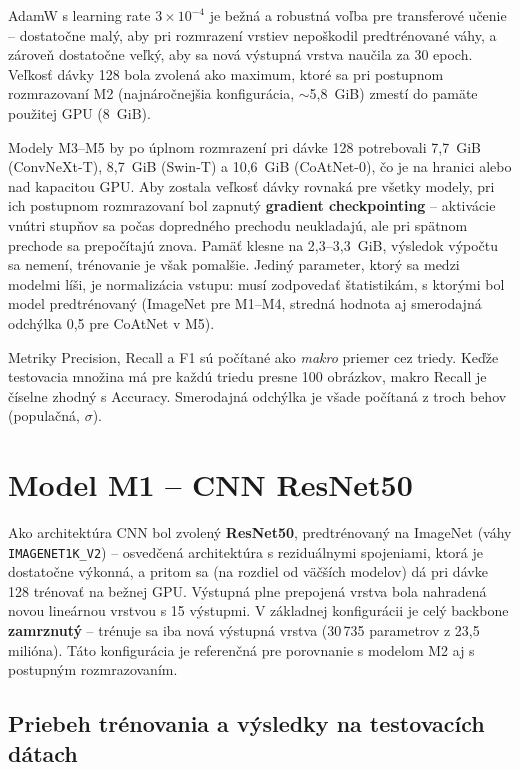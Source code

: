 AdamW s learning rate $3 \times 10^{-4}$ je bežná a robustná voľba pre
transferové učenie -- dostatočne malý, aby pri rozmrazení vrstiev
nepoškodil predtrénované váhy, a zároveň dostatočne veľký, aby sa nová
výstupná vrstva naučila za 30 epoch. Veľkosť dávky 128 bola zvolená ako
maximum, ktoré sa pri postupnom rozmrazovaní M2 (najnáročnejšia
konfigurácia, $\sim$5,8~GiB) zmestí do pamäte použitej GPU (8~GiB).

Modely M3--M5 by po úplnom rozmrazení pri dávke 128 potrebovali 7,7~GiB
(ConvNeXt-T), 8,7~GiB (Swin-T) a 10,6~GiB (CoAtNet-0), čo je na hranici
alebo nad kapacitou GPU. Aby zostala veľkosť dávky rovnaká pre všetky
modely, pri ich postupnom rozmrazovaní bol zapnutý \textbf{gradient
checkpointing} -- aktivácie vnútri stupňov sa počas dopredného prechodu
neukladajú, ale pri spätnom prechode sa prepočítajú znova. Pamäť klesne na
2,3--3,3~GiB, výsledok výpočtu sa nemení, trénovanie je však pomalšie.
Jediný parameter, ktorý sa medzi modelmi líši, je normalizácia vstupu: musí
zodpovedať štatistikám, s ktorými bol model predtrénovaný (ImageNet pre
M1--M4, stredná hodnota aj smerodajná odchýlka 0,5 pre CoAtNet v M5).

Metriky Precision, Recall a F1 sú počítané ako \emph{makro} priemer cez
triedy. Keďže testovacia množina má pre každú triedu presne 100 obrázkov,
makro Recall je číselne zhodný s Accuracy. Smerodajná odchýlka je všade
počítaná z troch behov (populačná, $\sigma$).

\section{Model M1 -- CNN ResNet50}
\label{sec:m1}

Ako architektúra CNN bol zvolený \textbf{ResNet50}, predtrénovaný na
ImageNet (váhy \texttt{IMAGENET1K\_V2}) -- osvedčená architektúra s
reziduálnymi spojeniami, ktorá je dostatočne výkonná, a pritom sa (na
rozdiel od väčších modelov) dá pri dávke 128 trénovať na bežnej GPU.
Výstupná plne prepojená vrstva bola nahradená novou lineárnou vrstvou
s 15 výstupmi. V základnej konfigurácii je celý backbone \textbf{zamrznutý}
-- trénuje sa iba nová výstupná vrstva (30\,735 parametrov z 23,5 milióna).
Táto konfigurácia je referenčná pre porovnanie s modelom M2
aj s postupným rozmrazovaním.

\subsection{Priebeh trénovania a výsledky na testovacích dátach}


